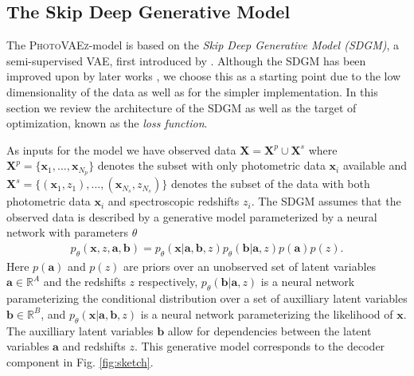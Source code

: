 \subsection{The Skip Deep Generative Model}
\label{subsec:ssvae}

The \textsc{PhotoVAEz}-model is based on the \textit{Skip Deep Generative Model (SDGM)}, a semi-supervised VAE, first introduced by \cite{maaloeAuxiliaryDeepGenerative2016}. Although the SDGM has been improved upon by later works \citep{maaloeBIVAVeryDeep2019}, we choose this as a starting point due to the low dimensionality of the data as well as for the simpler implementation. In this section we review the architecture of the SDGM as well as the target of optimization, known as the \textit{loss function}.

As inputs for the model we have observed data $\mathbf{X} = \mathbf{X}^p \cup \mathbf{X}^s$ where $\mathbf{X}^p = \{ \mathbf{x}_1,\dots,\mathbf{x}_{N_p} \}$ denotes the subset with only photometric data $\mathbf{x}_i$ available and $\mathbf{X}^s = \{ (\mathbf{x}_1, z_1), \dots , (\mathbf{x}_{N_s}, z_{N_s}) \}$ denotes the subset of the data with both photometric data $\mathbf{x}_i$ and spectroscopic redshifts $z_i$. The SDGM assumes that the observed data is described by a generative model parameterized by a neural network with parameters $\theta$ 
\begin{align}
    p_\theta(\mathbf{x}, z, \mathbf{a}, \mathbf{b}) = p_\theta(\mathbf{x}|\mathbf{a},\mathbf{b},z) p_\theta(\mathbf{b}|\mathbf{a},z) p(\mathbf{a}) p(z).    
\end{align}
Here $p(\mathbf{a})$ and $p(z)$ are priors over an unobserved set of latent variables $\mathbf{a}\in\mathbb{R}^A$ and the redshifts $z$ respectively, $p_\theta(\mathbf{b}|\mathbf{a},z)$ is a neural network parameterizing the conditional distribution over a set of auxilliary latent variables $\mathbf{b}\in\mathbb{R}^B$, and $p_\theta(\mathbf{x}|\mathbf{a},\mathbf{b},z)$ is a neural network parameterizing the likelihood of $\mathbf{x}$. The auxilliary latent variables $\mathbf{b}$ allow for dependencies between the latent variables $\mathbf{a}$ and redshifts $z$. This generative model corresponds to the decoder component in Fig. \ref{fig:sketch}.

